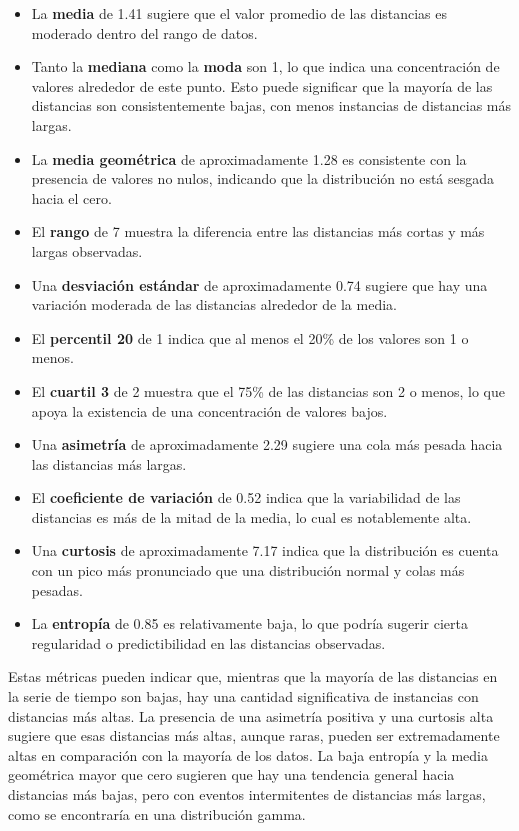 \documentclass[11pt]{article} %
\begin{document}
	\begin{itemize}
		\item La \textbf{media} de 1.41 sugiere que el valor promedio de las distancias es moderado dentro del rango de datos.
		\item Tanto la \textbf{mediana} como la \textbf{moda} son 1, lo que indica una concentración de valores alrededor de este punto. Esto puede significar que la mayoría de las distancias son consistentemente bajas, con menos instancias de distancias más largas.
		\item La \textbf{media geométrica} de aproximadamente 1.28 es consistente con la presencia de valores no nulos, indicando que la distribución no está sesgada hacia el cero.
		\item El \textbf{rango} de 7 muestra la diferencia entre las distancias más cortas y más largas observadas.
		\item Una \textbf{desviación estándar} de aproximadamente 0.74 sugiere que hay una variación moderada de las distancias alrededor de la media.
		\item El \textbf{percentil 20} de 1 indica que al menos el 20\% de los valores son 1 o menos.
		\item El \textbf{cuartil 3} de 2 muestra que el 75\% de las distancias son 2 o menos, lo que apoya la existencia de una concentración de valores bajos.
		\item Una \textbf{asimetría} de aproximadamente 2.29 sugiere una cola más pesada hacia las distancias más largas.
		\item El \textbf{coeficiente de variación} de 0.52 indica que la variabilidad de las distancias es más de la mitad de la media, lo cual es notablemente alta.
		\item Una \textbf{curtosis} de aproximadamente 7.17 indica que la distribución es cuenta con un pico más pronunciado que una distribución normal y colas más pesadas.
		\item La \textbf{entropía} de 0.85 es relativamente baja, lo que podría sugerir cierta regularidad o predictibilidad en las distancias observadas.
	\end{itemize}
	
	Estas métricas pueden indicar que, mientras que la mayoría de las distancias en la serie de tiempo son bajas, hay una cantidad significativa de instancias con distancias más altas. La presencia de una asimetría positiva y una curtosis alta sugiere que esas distancias más altas, aunque raras, pueden ser extremadamente altas en comparación con la mayoría de los datos. La baja entropía y la media geométrica mayor que cero sugieren que hay una tendencia general hacia distancias más bajas, pero con eventos intermitentes de distancias más largas, como se encontraría en una distribución gamma.
	
\end{document}
